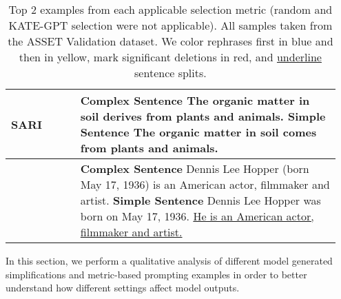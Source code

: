 \documentclass[11pt]{article}
\begin{document}
\begin{table*}[htbp]
\begin{tabular}{p{0.2\linewidth} p{0.75\linewidth}}
        \midrule
        SARI                & \textbf{Complex Sentence} The organic matter in soil \textcolor{Mycolor1}{derives} from plants and animals.  \newline \textbf{Simple Sentence}                                                                               The organic matter in soil \textcolor{Mycolor1}{comes} from plants and animals.                                                                     \\ \hline
                            & \textbf{Complex Sentence} Dennis Lee Hopper (born May 17, 1936) is an American actor, filmmaker and artist.                                           \newline       \textbf{Simple Sentence}        Dennis Lee Hopper was born on May 17, 1936. \underline{He is an American actor, filmmaker and artist.}     \\
        \bottomrule
        \end{tabular}
        \caption{Top 2 examples from each applicable selection metric (random and KATE-GPT selection were not applicable). All samples taken from the ASSET Validation dataset. We color rephrases first in \textcolor{Mycolor1}{blue} and then in \textcolor{Mycolor2}{yellow}, mark significant deletions in \textcolor{Mycolor3}{red}, and \underline{underline} sentence splits.} 
     \label{tab:top2examples}
    \end{table*}



In this section, we perform a qualitative analysis of different model generated simplifications and metric-based prompting examples in order to better understand how different settings affect model outputs. 
\end{document}
